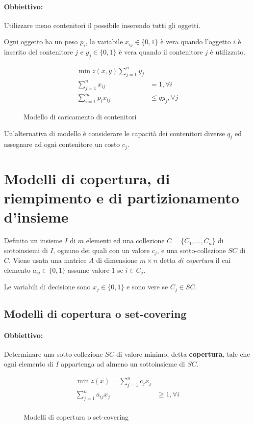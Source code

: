 \documentclass[\main/main.tex]{subfiles}
\begin{document}
\paragraph*{Obbiettivo:} Utilizzare meno contenitori il possibile inserendo tutti gli oggetti.

Ogni oggetto ha un peso $p_i$, la variabile $x_{ij} \in \{0,1\}$ è vera quando l'oggetto $i$ è inserito del contenitore $j$ e $y_j \in \{0,1\}$ è vera quando il contenitore $j$ è utilizzato.

\begin{figure}
  \begin{align*}
    \min z(x,y) \sum_{j=1}^n y_j                    \\
    \sum_{j=1}^n x_{ij}     & = 1, \forall i        \\
    \sum_{i=1}^m p_i x_{ij} & \leq q y_j, \forall j
  \end{align*}
  \caption{Modello di caricamento di contenitori}
\end{figure}

Un'alternativa di modello è considerare le capacità dei contenitori diverse $q_j$ ed assegnare ad ogni contenitore un costo $c_j$.

\section{Modelli di copertura, di riempimento e di partizionamento d'insieme}
Definito un insieme $I$ di $m$ elementi ed una collezione $C = \{C_1, \ldots, C_n\}$ di sottoinsiemi di $I$, ognuno dei quali con un valore $c_j$, e una sotto-collezione $SC$ di $C$. Viene usata una matrice $A$ di dimensione $m\times n$ detta \textit{di copertura} il cui elemento $a_{ij} \in \{0,1\}$ assume valore $1$ se $i \in C_j$.

Le variabili di decisione sono $x_j \in \{0,1\}$ e sono vere se $C_j \in SC$.

\subsection{Modelli di copertura o set-covering}
\paragraph*{Obbiettivo:} Determinare una sotto-collezione $SC$ di valore minimo, detta \textbf{copertura}, tale che ogni elemento di $I$ appartenga ad almeno un sottoinsieme di $SC$.

\begin{figure}
  \begin{align*}
    \min z(x) = \sum_{j=1}^n c_j x_j            \\
    \sum_{j=1}^n a_{ij} x_j & \geq 1, \forall i \\
  \end{align*}
  \caption{Modelli di copertura o set-covering}
\end{figure}
\end{document}
